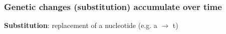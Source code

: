 \documentclass[Xcolor=svgnames,mathserif]{beamer}
\begin{document}
%
%
%
%
%
%




\begin{frame}
  \frametitle{Genetic changes (substitution) accumulate over time}

\vspace{.5cm}
\textbf{Substitution}: replacement of a nucleotide (e.g. a $\rightarrow$ t)
\vspace{-.25cm}


\end{frame}
\end{document}
